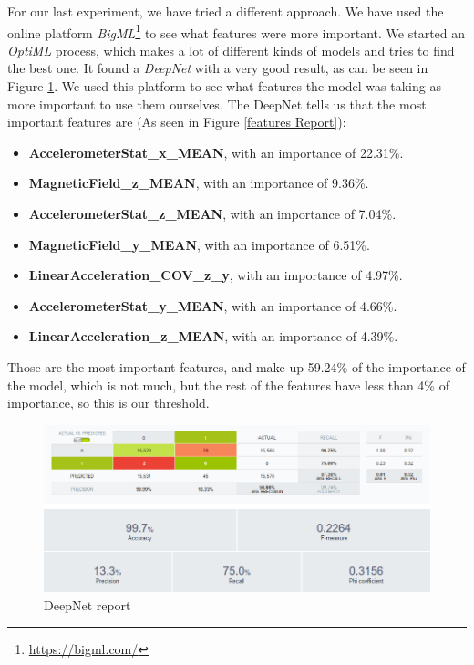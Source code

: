 \documentclass[idxtotoc,hyperref,openany]{labbook} %
\begin{document}


For our last experiment, we have tried a different approach. We have used the online platform \textit{BigML}\footnote{\href{https://bigml.com/}{https://bigml.com/}} to see what features were more important. We started an \textit{OptiML} process, which makes a lot of different kinds of models and tries to find the best one. It found a \textit{DeepNet} with a very good result, as can be seen in Figure \ref{DeepNet Report}. We used this platform to see what features the model was taking as more important to use them ourselves. The DeepNet tells us that the most important features are (As seen in Figure \ref{features Report}):

\begin{itemize}
\item \textbf{AccelerometerStat\_x\_MEAN}, with an importance of 22.31\%.
\item \textbf{MagneticField\_z\_MEAN}, with an importance of 9.36\%.
\item \textbf{AccelerometerStat\_z\_MEAN}, with an importance of 7.04\%.
\item \textbf{MagneticField\_y\_MEAN}, with an importance of 6.51\%.
\item \textbf{LinearAcceleration\_COV\_z\_y}, with an importance of 4.97\%.
\item \textbf{AccelerometerStat\_y\_MEAN}, with an importance of 4.66\%.
\item \textbf{LinearAcceleration\_z\_MEAN}, with an importance of 4.39\%.
\end{itemize}

Those are the most important features, and make up 59.24\% of the importance of the model, which is not much, but the rest of the features have less than 4\% of importance, so this is our threshold.



\begin{figure}[h]
\includegraphics[width=0.9\linewidth]{Milestone3/BigML_Result.png}
\setlength\belowcaptionskip{-10pt}
\caption{DeepNet report}
\label{DeepNet Report}
\end{figure}
\end{document}
